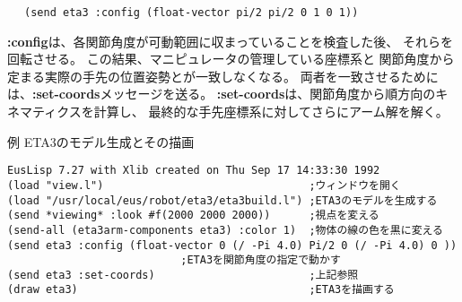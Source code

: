 \begin{verbatim}
　 (send eta3 :config (float-vector pi/2 pi/2 0 1 0 1))
\end{verbatim}

{\bf :config}は、各関節角度が可動範囲に収まっていることを検査した後、
それらを回転させる。
この結果、マニピュレータの管理している座標系と
関節角度から定まる実際の手先の位置姿勢とが一致しなくなる。
両者を一致させるためには、{\bf :set-coords}メッセージを送る。
{\bf :set-coords}は、関節角度から順方向のキネマティクスを計算し、
最終的な手先座標系に対してさらにアーム解を解く。


例 ETA3のモデル生成とその描画
\begin{verbatim}
EusLisp 7.27 with Xlib created on Thu Sep 17 14:33:30 1992
(load "view.l")                                ;ウィンドウを開く
(load "/usr/local/eus/robot/eta3/eta3build.l") ;ETA3のモデルを生成する
(send *viewing* :look #f(2000 2000 2000))      ;視点を変える
(send-all (eta3arm-components eta3) :color 1)  ;物体の線の色を黒に変える
(send eta3 :config (float-vector 0 (/ -Pi 4.0) Pi/2 0 (/ -Pi 4.0) 0 ))
					       ;ETA3を関節角度の指定で動かす
(send eta3 :set-coords)                        ;上記参照
(draw eta3)                                    ;ETA3を描画する
\end{verbatim}

\newpage
